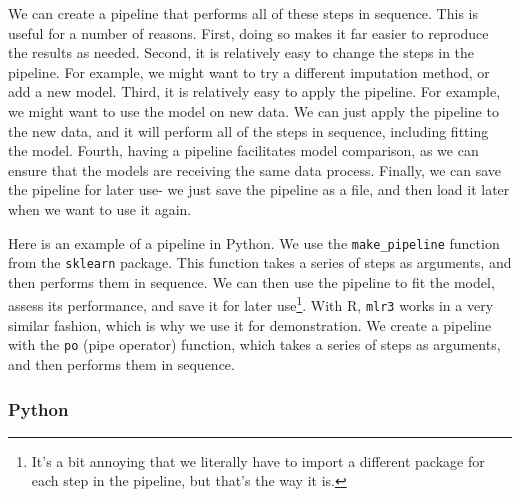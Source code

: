 \documentclass[
  letterpaper,
]{krantz}
\begin{document}
We can create a pipeline that performs all of these steps in sequence.
This is useful for a number of reasons. First, doing so makes it far
easier to reproduce the results as needed. Second, it is relatively easy
to change the steps in the pipeline. For example, we might want to try a
different imputation method, or add a new model. Third, it is relatively
easy to apply the pipeline. For example, we might want to use the model
on new data. We can just apply the pipeline to the new data, and it will
perform all of the steps in sequence, including fitting the model.
Fourth, having a pipeline facilitates model comparison, as we can ensure
that the models are receiving the same data process. Finally, we can
save the pipeline for later use- we just save the pipeline as a file,
and then load it later when we want to use it again.

Here is an example of a pipeline in Python. We use the
\texttt{make\_pipeline} function from the \texttt{sklearn} package. This
function takes a series of steps as arguments, and then performs them in
sequence. We can then use the pipeline to fit the model, assess its
performance, and save it for later use\footnote{It's a bit annoying that
  we literally have to import a different package for each step in the
  pipeline, but that's the way it is.}. With R, \texttt{mlr3} works in a
very similar fashion, which is why we use it for demonstration. We
create a pipeline with the \texttt{po} (pipe operator) function, which
takes a series of steps as arguments, and then performs them in
sequence.

\subsubsection{Python}
\end{document}
